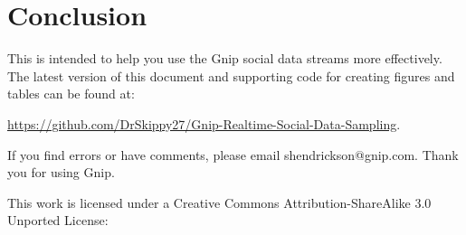 \documentclass{article}
\begin{document}
\section{Conclusion} 

This is intended to help you use the Gnip social data streams more effectively.  The latest version of this
document and supporting code for creating figures and tables can be found at:

\noindent \url{https://github.com/DrSkippy27/Gnip-Realtime-Social-Data-Sampling}.

If you find errors
or have comments, please email shendrickson@gnip.com. Thank you for using Gnip.

This work is licensed under a Creative Commons Attribution-ShareAlike 3.0 Unported License:
\end{document}
